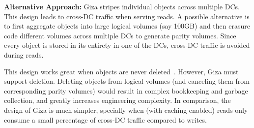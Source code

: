 {\bf Alternative Approach:} Giza stripes individual objects across multiple DCs. This design leads to cross-DC traffic when serving reads. A possible alternative is to first aggregate objects into large logical volumes (say 100GB) and then erasure code different volumes across multiple DCs to generate parity volumes. Since every object is stored in its entirety in one of the DCs, cross-DC traffic is avoided during reads.

This design works great when objects are never deleted~\cite{f4:osdi14}. However, Giza must support deletion. Deleting objects from logical volumes (and canceling them from corresponding parity volumes) would result in complex bookkeeping and garbage collection, and greatly increases engineering complexity. In comparison, the design of Giza is much simpler, specially when (with caching enabled) reads only consume a small percentage of cross-DC traffic compared to writes. 

